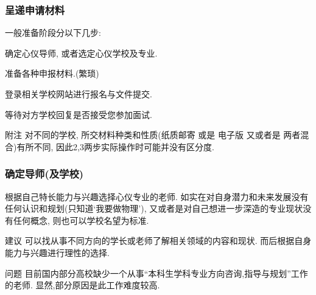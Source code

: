 \documentclass[usenames,dvipsnames]{beamer}
\begin{document}
    \begin{frame}
      \frametitle{呈递申请材料}

      一般准备阶段分以下几步:

      \begin{description}[leftmargin=!,labelwidth=\widthof{\bfseries 确定(导师及)学校}]
        \small
        \item[确定导师(及学校)] 确定心仪导师, 或者选定心仪学校及专业.
        \item[准备材料]        准备各种申报材料.(繁琐)
        \item[提交申请]        登录相关学校网站进行报名与文件提交. 
        \item[等待回复]        等待对方学校回复是否接受您参加面试.
      \end{description}

      \begin{block}{附注}
        对不同的学校, 所交材料种类和性质(纸质邮寄 或是 电子版 又或者是 两者混合)有所不同, 因此2,3两步实际操作时可能并没有区分度. 
      \end{block}
    \end{frame}

    \begin{frame}
      \frametitle{确定导师(及学校)} 
      根据自己特长能力与兴趣选择心仪专业的老师. 如实在对自身潜力和未来发展没有任何认识和规划(只知道`我要做物理'), 又或者是对自己想进一步深造的专业现状没有任何概念, 则也可以学校名望为标准.

      \begin{block}{建议}
        可以找从事不同方向的学长或老师了解相关领域的内容和现状. 而后根据自身能力与兴趣进行理性的选择.
      \end{block}

      \begin{alertblock}{问题}
        目前国内部分高校缺少一个从事``本科生学科专业方向咨询,指导与规划''工作的老师. 显然,部分原因是此工作难度较高.
      \end{alertblock}
    \end{frame}
\end{document}
